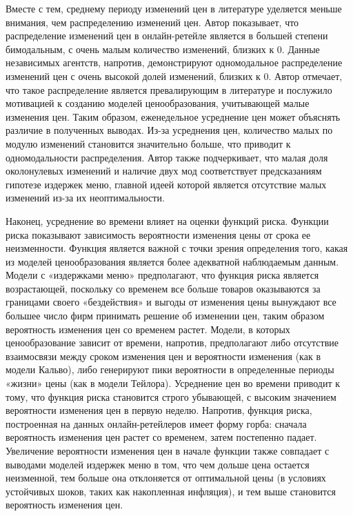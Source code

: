 Вместе с тем, среднему периоду изменений цен в литературе уделяется меньше внимания, чем распределению изменений цен. Автор показывает, что распределение изменений цен в онлайн-ретейле является в большей степени бимодальным, с очень малым количество изменений, близких к 0. Данные независимых агентств, напротив, демонстрируют одномодальное распределение изменений цен с очень высокой долей изменений, близких к 0. Автор отмечает, что такое распределение является превалирующим в литературе и послужило мотивацией к созданию моделей ценообразования, учитывающей малые изменения цен. Таким образом, еженедельное усреднение цен может объяснять различие в полученных выводах. Из-за усреднения цен, количество малых по модулю изменений становится значительно больше, что приводит к одномодальности распределения. Автор также подчеркивает, что малая доля околонулевых изменений и наличие двух мод соответствует предсказаниям гипотезе издержек меню, главной идеей которой является отсутствие малых изменений из-за их неоптимальности.

Наконец, усреднение во времени влияет на оценки функций риска. Функции риска показывают зависимость вероятности изменения цены от срока ее неизменности. Функция является важной с точки зрения определения того, какая из моделей ценообразования является более адекватной наблюдаемым данным. Модели с «издержками меню» предполагают, что функция риска является возрастающей, поскольку со временем все больше товаров оказываются за границами своего «бездействия» и выгоды от изменения цены вынуждают все большее число фирм принимать решение об изменении цен, таким образом вероятность изменения цен со временем растет. Модели, в которых ценообразование зависит от времени, напротив, предполагают либо отсутствие взаимосвязи между сроком изменения цен и вероятности изменения (как в модели Кальво), либо генерируют пики вероятности в определенные периоды «жизни» цены (как в модели Тейлора). Усреднение цен во времени приводит к тому, что функция риска становится строго убывающей, с высоким значением вероятности изменения цен в первую неделю. Напротив, функция риска, построенная на данных онлайн-ретейлеров имеет форму горба: сначала вероятность изменения цен растет со временем, затем постепенно падает. Увеличение вероятности изменения цен в начале функции также совпадает с выводами моделей издержек меню в том, что чем дольше цена остается неизменной, тем больше она отклоняется от оптимальной цены (в условиях устойчивых шоков, таких как накопленная инфляция), и тем выше становится вероятность изменения цен.

